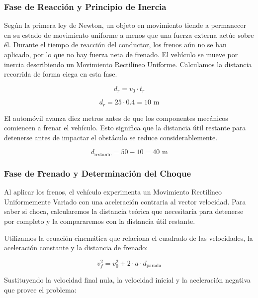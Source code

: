 \documentclass[12pt, a4paper]{article}
\begin{document}
\subsubsection*{Fase de Reacción y Principio de Inercia}

Según la primera ley de Newton, un objeto en movimiento tiende a permanecer en su estado de movimiento uniforme a menos que una fuerza externa actúe sobre él. Durante el tiempo de reacción del conductor, los frenos aún no se han aplicado, por lo que no hay fuerza neta de frenado. El vehículo se mueve por inercia describiendo un Movimiento Rectilíneo Uniforme. Calculamos la distancia recorrida de forma ciega en esta fase.

\begin{equation}
d_r = v_0 \cdot t_r
\end{equation}

\begin{equation}
d_r = 25 \cdot 0.4 = 10 \text{ m}
\end{equation}

El automóvil avanza diez metros antes de que los componentes mecánicos comiencen a frenar el vehículo. Esto significa que la distancia útil restante para detenerse antes de impactar el obstáculo se reduce considerablemente.

\begin{equation}
d_{\text{restante}} = 50 - 10 = 40 \text{ m}
\end{equation}

\subsubsection*{Fase de Frenado y Determinación del Choque}

Al aplicar los frenos, el vehículo experimenta un Movimiento Rectilíneo Uniformemente Variado con una aceleración contraria al vector velocidad. Para saber si choca, calcularemos la distancia teórica que necesitaría para detenerse por completo y la compararemos con la distancia útil restante.

Utilizamos la ecuación cinemática que relaciona el cuadrado de las velocidades, la aceleración constante y la distancia de frenado:

\begin{equation}
v_f^2 = v_0^2 + 2 \cdot a \cdot d_{\text{parada}}
\end{equation}

Sustituyendo la velocidad final nula, la velocidad inicial y la aceleración negativa que provee el problema:
\end{document}
